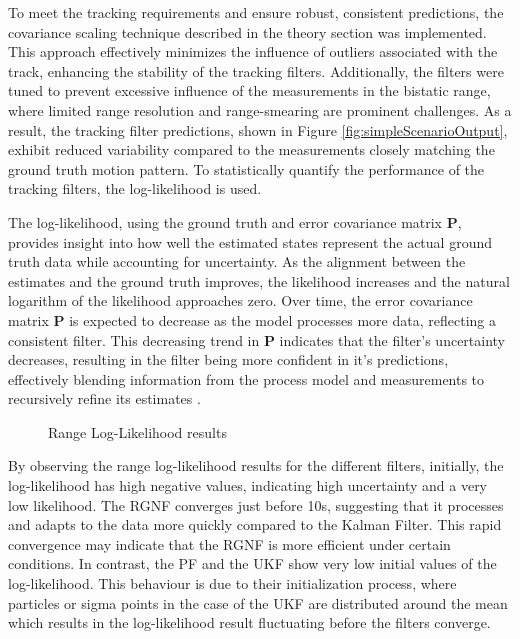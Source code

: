 To meet the tracking requirements and ensure robust, consistent predictions, the covariance scaling technique described in the theory section was implemented. This approach effectively minimizes the influence of outliers associated with the track, enhancing the stability of the tracking filters. Additionally, the filters were tuned to prevent excessive influence of the measurements in the bistatic range, where limited range resolution and range-smearing are prominent challenges. As a result, the tracking filter predictions, shown in Figure \ref{fig:simpleScenarioOutput}, exhibit reduced variability compared to the measurements closely matching the ground truth motion pattern. To statistically quantify the performance of the tracking filters, the log-likelihood is used.

The log-likelihood, using the ground truth and error covariance matrix \(\mathbf{P}\), provides insight into how well the estimated states represent the actual ground truth data while accounting for uncertainty. As the alignment between the estimates and the ground truth improves, the likelihood increases and the natural logarithm of the likelihood approaches zero. Over time, the error covariance matrix \(\mathbf{P}\) is expected to decrease as the model processes more data, reflecting a consistent filter. This decreasing trend in \(\mathbf{P}\) indicates that the filter's uncertainty decreases, resulting in the filter being more confident in it's predictions, effectively blending information from the process model and measurements to recursively refine its estimates \cite{chen2018weak}.

\begin{figure}[H]
    \centering
    
    \caption{Range Log-Likelihood results}
    \label{fig:rangeLogLikeP}
\end{figure}

By observing the range log-likelihood results for the different filters, initially, the log-likelihood has high negative values, indicating high uncertainty and a very low likelihood. The \ac{RGNF} converges just before 10s, suggesting that it processes and adapts to the data more quickly compared to the Kalman Filter. This rapid convergence may indicate that the \ac{RGNF} is more efficient under certain conditions. In contrast, the \ac{PF} and the \ac{UKF} show very low initial values of the log-likelihood. This behaviour is due to their initialization process, where particles or sigma points in the case of the \ac{UKF}  are distributed around the mean which results in the log-likelihood result fluctuating before the filters converge.

